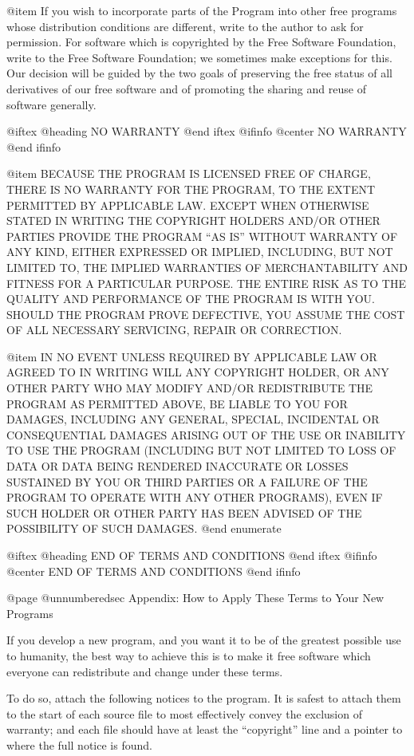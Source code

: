 @item
If you wish to incorporate parts of the Program into other free
programs whose distribution conditions are different, write to the author
to ask for permission.  For software which is copyrighted by the Free
Software Foundation, write to the Free Software Foundation; we sometimes
make exceptions for this.  Our decision will be guided by the two goals
of preserving the free status of all derivatives of our free software and
of promoting the sharing and reuse of software generally.

@iftex
@heading NO WARRANTY
@end iftex
@ifinfo
@center NO WARRANTY
@end ifinfo

@item
BECAUSE THE PROGRAM IS LICENSED FREE OF CHARGE, THERE IS NO WARRANTY
FOR THE PROGRAM, TO THE EXTENT PERMITTED BY APPLICABLE LAW.  EXCEPT WHEN
OTHERWISE STATED IN WRITING THE COPYRIGHT HOLDERS AND/OR OTHER PARTIES
PROVIDE THE PROGRAM ``AS IS'' WITHOUT WARRANTY OF ANY KIND, EITHER EXPRESSED
OR IMPLIED, INCLUDING, BUT NOT LIMITED TO, THE IMPLIED WARRANTIES OF
MERCHANTABILITY AND FITNESS FOR A PARTICULAR PURPOSE.  THE ENTIRE RISK AS
TO THE QUALITY AND PERFORMANCE OF THE PROGRAM IS WITH YOU.  SHOULD THE
PROGRAM PROVE DEFECTIVE, YOU ASSUME THE COST OF ALL NECESSARY SERVICING,
REPAIR OR CORRECTION.

@item
IN NO EVENT UNLESS REQUIRED BY APPLICABLE LAW OR AGREED TO IN WRITING WILL
ANY COPYRIGHT HOLDER, OR ANY OTHER PARTY WHO MAY MODIFY AND/OR
REDISTRIBUTE THE PROGRAM AS PERMITTED ABOVE, BE LIABLE TO YOU FOR DAMAGES,
INCLUDING ANY GENERAL, SPECIAL, INCIDENTAL OR CONSEQUENTIAL DAMAGES
ARISING OUT OF THE USE OR INABILITY TO USE THE PROGRAM (INCLUDING BUT NOT
LIMITED TO LOSS OF DATA OR DATA BEING RENDERED INACCURATE OR LOSSES
SUSTAINED BY YOU OR THIRD PARTIES OR A FAILURE OF THE PROGRAM TO OPERATE
WITH ANY OTHER PROGRAMS), EVEN IF SUCH HOLDER OR OTHER PARTY HAS BEEN
ADVISED OF THE POSSIBILITY OF SUCH DAMAGES.
@end enumerate

@iftex
@heading END OF TERMS AND CONDITIONS
@end iftex
@ifinfo
@center END OF TERMS AND CONDITIONS
@end ifinfo

@page
@unnumberedsec Appendix: How to Apply These Terms to Your New Programs

  If you develop a new program, and you want it to be of the greatest
possible use to humanity, the best way to achieve this is to make it
free software which everyone can redistribute and change under these
terms.

  To do so, attach the following notices to the program.  It is safest to
attach them to the start of each source file to most effectively convey
the exclusion of warranty; and each file should have at least the
``copyright'' line and a pointer to where the full notice is found.

